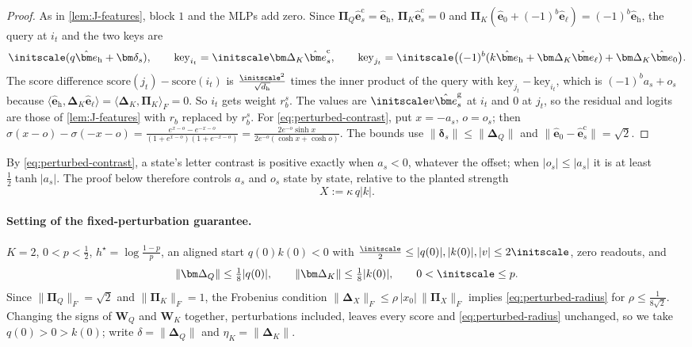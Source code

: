 \begin{proof}
As in \cref{lem:J-features}, block $1$ and the MLPs add zero. Since $\bm\Pi_Q\hat{\bm e}^{\mathrm c}_s=\hat{\bm e}_{\mathrm h}$,
$\bm\Pi_K\hat{\bm e}^{\mathrm c}_s=0$ and $\bm\Pi_K(\hat{\bm e}_0+(-1)^b\hat{\bm e}_\ell)=(-1)^b\hat{\bm e}_{\mathrm h}$, the query at $i_t$ and the
two keys are
\[
 \initscale(q\hat{\bm e}_{\mathrm h}+\bm\delta_s),\qquad \mathrm{key}_{i_t}=\initscale\bm\Delta_K\hat{\bm e}^{\mathrm c}_s,\qquad
 \mathrm{key}_{j_t}=\initscale\bigl((-1)^b(k\hat{\bm e}_{\mathrm h}+\bm\Delta_K\hat{\bm e}_\ell)+\bm\Delta_K\hat{\bm e}_0\bigr).
\]
The score difference $\mathrm{score}(j_t)-\mathrm{score}(i_t)$ is $\frac{\initscale^2}{\sqrt{d_{\mathrm h}}}$ times the inner product of the query with
$\mathrm{key}_{j_t}-\mathrm{key}_{i_t}$, which is $(-1)^ba_s+o_s$ because $\langle\hat{\bm e}_{\mathrm h},\bm\Delta_K\hat{\bm e}_\ell\rangle=\langle\bm\Delta_K,\bm\Pi_K\rangle_F=0$.
So $i_t$ gets weight $r^s_b$. The values are $\initscale v\hat{\bm e}^{\mathrm g}_s$ at $i_t$ and $0$ at $j_t$, so the residual and logits are those of
\cref{lem:J-features} with $r_b$ replaced by $r^s_b$. For \cref{eq:perturbed-contrast}, put $x=-a_s$, $o=o_s$; then
$\sigma(x-o)-\sigma(-x-o)=\frac{e^{x-o}-e^{-x-o}}{(1+e^{x-o})(1+e^{-x-o})}=\frac{2e^{-o}\sinh x}{2e^{-o}(\cosh x+\cosh o)}$. The bounds use
$\|\bm\delta_s\|\le\|\bm\Delta_Q\|$ and $\|\hat{\bm e}_0-\hat{\bm e}^{\mathrm c}_s\|=\sqrt2$.
\end{proof}

By \cref{eq:perturbed-contrast}, a state's letter contrast is positive exactly when $a_s<0$, whatever the offset; when $|o_s|\le|a_s|$ it is at
least $\frac12\tanh|a_s|$. The proof below therefore controls $a_s$ and $o_s$ state by state, relative to the planted strength
\[
 X:=\kappa\,q|k|.
\]

\paragraph{Setting of the fixed-perturbation guarantee.} $K=2$, $0<p<\frac12$, $h^\star=\log\frac{1-p}{p}$, an aligned start $q(0)k(0)<0$ with
$\frac{\initscale}{2}\le|q(0)|,|k(0)|,|v|\le2\initscale$, zero readouts, and
\begin{equation}
 \|\bm\Delta_Q\|\le\tfrac18|q(0)|,\qquad \|\bm\Delta_K\|\le\tfrac18|k(0)|,\qquad 0<\initscale\le p .
 \label{eq:perturbed-radius}
\end{equation}
Since $\|\bm\Pi_Q\|_F=\sqrt2$ and $\|\bm\Pi_K\|_F=1$, the Frobenius condition $\|\bm\Delta_X\|_F\le\rho\,|x_0|\,\|\bm\Pi_X\|_F$ implies
\cref{eq:perturbed-radius} for $\rho\le\frac{1}{8\sqrt2}$. Changing the signs of $\mathbf W_Q$ and $\mathbf W_K$ together, perturbations included, leaves every score
and \cref{eq:perturbed-radius} unchanged, so we take $q(0)>0>k(0)$; write $\delta=\|\bm\Delta_Q\|$ and $\eta_K=\|\bm\Delta_K\|$.

